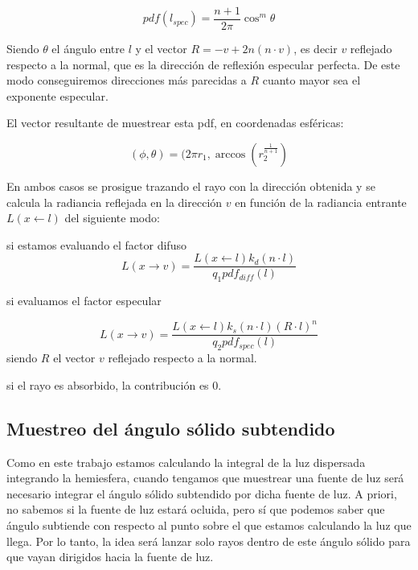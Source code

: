 \begin{equation}
pdf(l_{spec}) = \frac{n + 1}{2\pi}\cos^m\theta
\end{equation}

Siendo $\theta$ el ángulo entre $l$ y el vector $R = -v + 2n(n \cdot v)$, es decir $v$ reflejado respecto a la normal, que es la dirección de reflexión especular perfecta. De este modo conseguiremos direcciones más parecidas a $R$ cuanto mayor sea el exponente especular.

\medskip

El vector resultante de muestrear esta pdf, en coordenadas esféricas:

\begin{equation}
(\phi, \theta) = (2\pi r_1, \arccos(r_2^{\frac{1}{n+1}}) 
\end{equation}

En ambos casos se prosigue trazando el rayo con la dirección obtenida y se calcula la radiancia reflejada en la dirección $v$ en función de la radiancia entrante $L(x \gets l)$ del siguiente modo:
\medskip

si  estamos evaluando el factor difuso
\begin{equation}
L(x \to v) = \frac{L(x \gets l)k_d(n \cdot l)}{q_1 pdf_{diff}(l)}
\end{equation}

si  evaluamos el factor especular

\begin{equation}
L(x \to v) = \frac{L(x \gets l)k_s(n \cdot l)(R \cdot l)^n}{q_2 pdf_{spec}(l)}
\end{equation}
siendo $R$ el vector $v$ reflejado respecto a la normal.

si  el rayo es absorbido, la contribución es $0$.




\clearpage

\subsection{Muestreo del ángulo sólido subtendido}
\label{sample_solid}

Como en este trabajo estamos calculando la integral de la luz dispersada integrando la hemiesfera, cuando tengamos que muestrear una fuente de luz será necesario integrar el ángulo sólido subtendido por dicha fuente de luz. A priori, no sabemos si  la fuente de luz estará ocluida, pero sí que podemos saber que ángulo subtiende con respecto al punto sobre el que estamos calculando la luz que llega. Por lo tanto, la idea será lanzar solo rayos dentro de este ángulo sólido para que vayan dirigidos hacia la fuente de luz.

